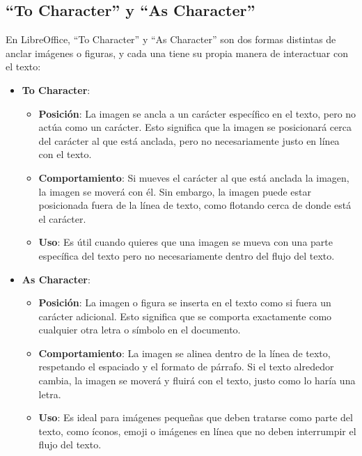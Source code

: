 \documentclass[
  jou,
  floatsintext,
  longtable,
  a4paper,
  nolmodern,
  notxfonts,
  notimes,
  12pt,
  colorlinks=true,linkcolor=blue,citecolor=blue,urlcolor=blue]{apa7}
\begin{document}
\subsection{``To Character'' y ``As
Character''}\label{to-character-y-as-character}

En LibreOffice, ``To Character'' y ``As Character'' son dos formas
distintas de anclar imágenes o figuras, y cada una tiene su propia
manera de interactuar con el texto:

\begin{itemize}
\item
  \textbf{To Character}:

  \begin{itemize}
  \item
    \textbf{Posición}: La imagen se ancla a un carácter específico en el
    texto, pero no actúa como un carácter. Esto significa que la imagen
    se posicionará cerca del carácter al que está anclada, pero no
    necesariamente justo en línea con el texto.
  \item
    \textbf{Comportamiento}: Si mueves el carácter al que está anclada
    la imagen, la imagen se moverá con él. Sin embargo, la imagen puede
    estar posicionada fuera de la línea de texto, como flotando cerca de
    donde está el carácter.
  \item
    \textbf{Uso}: Es útil cuando quieres que una imagen se mueva con una
    parte específica del texto pero no necesariamente dentro del flujo
    del texto.
  \end{itemize}
\item
  \textbf{As Character}:

  \begin{itemize}
  \item
    \textbf{Posición}: La imagen o figura se inserta en el texto como si
    fuera un carácter adicional. Esto significa que se comporta
    exactamente como cualquier otra letra o símbolo en el documento.
  \item
    \textbf{Comportamiento}: La imagen se alinea dentro de la línea de
    texto, respetando el espaciado y el formato de párrafo. Si el texto
    alrededor cambia, la imagen se moverá y fluirá con el texto, justo
    como lo haría una letra.
  \item
    \textbf{Uso}: Es ideal para imágenes pequeñas que deben tratarse
    como parte del texto, como íconos, emoji o imágenes en línea que no
    deben interrumpir el flujo del texto.
  \end{itemize}
\end{itemize}
\end{document}

